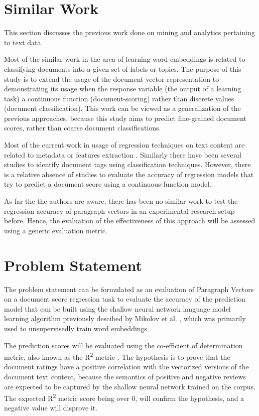 \documentclass[conference]{IEEEtran}
\begin{document}
\section{Similar Work}
This section discusses the previous work done on mining and analytics pertaining to text data.

Most of the similar work in the area of learning word-embeddings is related to classifying documents into a given set of labels or topics. The purpose of this study is to extend the usage of the document vector representation to demonstrating its usage when the response variable (the output of a learning task) a continuous function (document-scoring) rather than discrete values (document classification). This work can be viewed as a generalization of the previous approaches, because this study aims to predict fine-grained document scores, rather than coarse document classifications.

Most of the current work in usage of regression techniques on text content are related to metadata or features extraction \cite{su2015genetic} \cite{weissman2016natural}. Similarly there have been several studies to identify document tags using classification techniques\cite{bespalov2011sentiment}\cite{pang2002thumbs}. However, there is a relative absence of studies to evaluate the accuracy of regression models that try to predict a document score using a continuous-function model.

As far the the authors are aware, there has been no similar work to test the regression accuracy of paragraph vectors in an experimental research setup before. Hence, the evaluation of the effectiveness of this approach will be assessed using a generic evaluation metric.


\section{Problem Statement}
The problem statement can be formulated as an evaluation of Paragraph Vectors \cite{le2014distributed} on a document score regression task to evaluate the accuracy of the prediction model that can be built using the shallow neural network language model learning algorithm previously descibed by Mikolov et al. \cite{mikolov2013efficient}, which was primarily used to unsupervisedly train word embeddings.

The prediction scores will be evaluated using the co-efficient of determination metric, also known as the R\textsuperscript{2} metric \cite{cameron1997r}. The hypothesis is to prove that the document ratings have a positive correlation with the vectorized versions of the document text content, because the semantics of positive and negative reviews are expected to be captured by the shallow neural network trained on the corpus. The expected R\textsuperscript{2} metric score being over 0, will confirm the hypothesis, and a negative value will disprove it.
\end{document}

